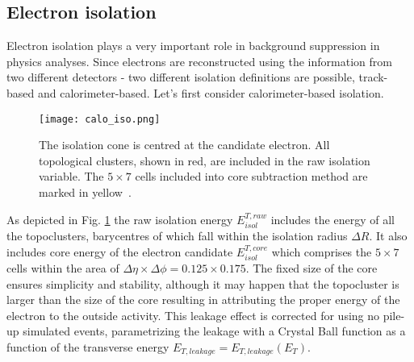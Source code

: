     \subsection{Electron isolation}
    Electron isolation plays a very important role in background suppression in physics analyses. Since electrons are reconstructed using the information from two different detectors - two different isolation definitions are possible, track-based and calorimeter-based. Let's first consider calorimeter-based isolation.
    
	 \begin{figure}[htbp]
		\centering
		\texttt{[image: calo\_iso.png]}
		\caption[Isolation cone]{The isolation cone is centred at the candidate electron. All topological clusters, shown in red, are included in the raw isolation variable. The $5\times 7$ cells included into core subtraction method are marked in yellow~\cite{topoclust_2019}.}
		\label{fig::calo_iso}
	\end{figure}
	As depicted in Fig. \ref{fig::calo_iso} the raw isolation energy $E_{isol}^{T,raw}$ includes the energy of all the topoclusters, barycentres of which fall within the isolation radius $\Delta R$. It also includes core energy of the electron candidate $E_{isol}^{T,core}$ which comprises the $5\times 7$ cells within the area of $\Delta \eta \times \Delta \phi = 0.125 \times 0.175$. The fixed size of the core ensures simplicity and stability, although it may happen that the topocluster is larger than the size of the core resulting in attributing the proper energy of the electron to the outside activity. This leakage effect is corrected for using no pile-up simulated events, parametrizing the leakage with a Crystal Ball function as a function of the transverse energy $E_{T,leakage}=E_{T,leakage}(E_T)$.
	

